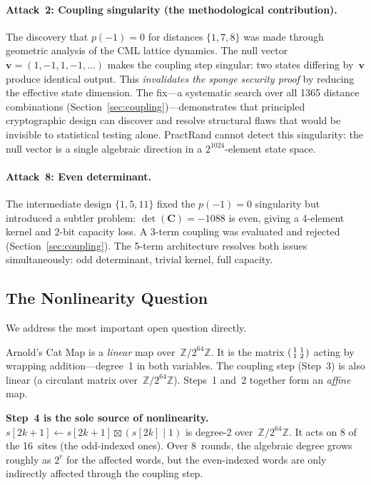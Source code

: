 \documentclass[runningheads]{llncs}
\newcommand{\Ztwo}{\mathbb{Z}/2^{64}\mathbb{Z}}
\newcommand{\coupmat}{\mathbf{C}}
\begin{document}
\paragraph{Attack~2: Coupling singularity (the methodological contribution).}
The discovery that $p(-1) = 0$ for distances $\{1,7,8\}$ was made through
geometric analysis of the CML lattice dynamics.  The null vector
$\mathbf{v} = (1, -1, 1, -1, \ldots)$ makes the coupling step singular:
two states differing by~$\mathbf{v}$ produce identical output.
This \emph{invalidates the sponge security proof} by reducing the effective
state dimension.  The fix---a systematic search over all 1365 distance
combinations (Section~\ref{sec:coupling})---demonstrates that principled
cryptographic design can discover and resolve structural flaws that would
be invisible to statistical testing alone.  PractRand cannot detect this
singularity: the null vector is a single algebraic direction in a
$2^{1024}$-element state space.

\paragraph{Attack~8: Even determinant.}
The intermediate design $\{1,5,11\}$ fixed the $p(-1) = 0$ singularity
but introduced a subtler problem: $\det(\coupmat) = -1088$ is even,
giving a 4-element kernel and 2-bit capacity loss.  A 3-term coupling was
evaluated and rejected (Section~\ref{sec:coupling}).  The 5-term architecture
resolves both issues simultaneously: odd determinant, trivial kernel,
full capacity.

\subsection{The Nonlinearity Question}
\label{sec:nonlinearity}

We address the most important open question directly.

Arnold's Cat Map is a \emph{linear} map over~$\Ztwo$.  It is the matrix
$\begin{psmallmatrix}1&1\\1&2\end{psmallmatrix}$ acting by wrapping addition---degree~1 in both variables.  The coupling step (Step~3) is also linear (a
circulant matrix over~$\Ztwo$).  Steps~1 and~2 together form an \emph{affine}
map.

\textbf{Step~4 is the sole source of nonlinearity.}
$s[2k+1] \gets s[2k+1] \boxtimes (s[2k] \mathbin{|} 1)$ is degree-2 over~$\Ztwo$.
It acts on 8 of the 16~sites (the odd-indexed ones).  Over 8~rounds, the
algebraic degree grows roughly as $2^r$ for the affected words, but the
even-indexed words are only indirectly affected through the coupling step.
\end{document}
